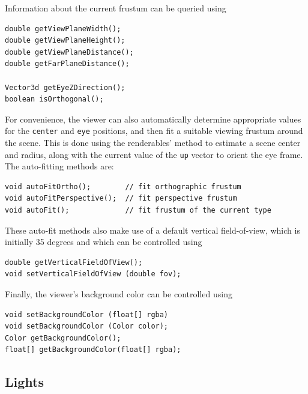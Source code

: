 Information about the current frustum can be queried using
%
\begin{lstlisting}[]
double getViewPlaneWidth();
double getViewPlaneHeight();
double getViewPlaneDistance();
double getFarPlaneDistance();

Vector3d getEyeZDirection();
boolean isOrthogonal();
\end{lstlisting}
%

For convenience, the viewer can also automatically determine
appropriate values for the {\tt center} and {\tt eye} positions, and
then fit a suitable viewing frustum around the scene. This is done
using the renderables'
 method to
estimate a scene center and radius, along with the current value of
the {\tt up} vector to orient the eye frame. The auto-fitting
methods are:
%
\begin{lstlisting}[]
void autoFitOrtho();        // fit orthographic frustum
void autoFitPerspective();  // fit perspective frustum
void autoFit();             // fit frustum of the current type
\end{lstlisting}
%
These auto-fit methods also make use of a default vertical
field-of-view, which is initially 35 degrees and which
can be controlled using
%
\begin{lstlisting}[]
double getVerticalFieldOfView();
void setVerticalFieldOfView (double fov);
\end{lstlisting}
%

Finally, the viewer's background color can be controlled using
%
\begin{lstlisting}[]
void setBackgroundColor (float[] rgba)
void setBackgroundColor (Color color);
Color getBackgroundColor();
float[] getBackgroundColor(float[] rgba);
\end{lstlisting}
%

\subsection{Lights}
\label{lights:sec}

